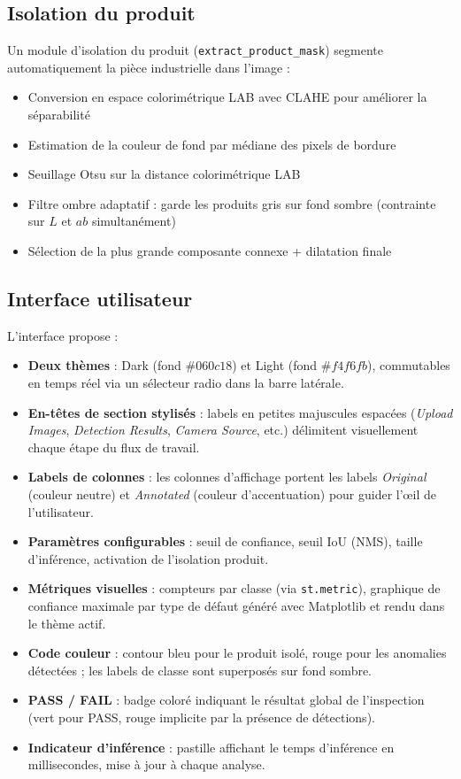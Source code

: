 \documentclass[12pt, a4paper]{report}
\begin{document}
\subsection{Isolation du produit}

Un module d'isolation du produit (\texttt{extract\_product\_mask}) segmente automatiquement la pièce industrielle dans l'image :
\begin{itemize}
  \item Conversion en espace colorimétrique LAB avec CLAHE pour améliorer la séparabilité
  \item Estimation de la couleur de fond par médiane des pixels de bordure
  \item Seuillage Otsu sur la distance colorimétrique LAB
  \item Filtre ombre adaptatif : garde les produits gris sur fond sombre (contrainte sur $L$ et $ab$ simultanément)
  \item Sélection de la plus grande composante connexe + dilatation finale
\end{itemize}

\subsection{Interface utilisateur}

L'interface propose :
\begin{itemize}
  \item \textbf{Deux thèmes} : Dark (fond $\#060c18$) et Light (fond $\#f4f6fb$), commutables en temps réel via un sélecteur radio dans la barre latérale.
  \item \textbf{En-têtes de section stylisés} : labels en petites majuscules espacées (\textit{Upload Images}, \textit{Detection Results}, \textit{Camera Source}, etc.) délimitent visuellement chaque étape du flux de travail.
  \item \textbf{Labels de colonnes} : les colonnes d'affichage portent les labels \textit{Original} (couleur neutre) et \textit{Annotated} (couleur d'accentuation) pour guider l'œil de l'utilisateur.
  \item \textbf{Paramètres configurables} : seuil de confiance, seuil IoU (NMS), taille d'inférence, activation de l'isolation produit.
  \item \textbf{Métriques visuelles} : compteurs par classe (via \texttt{st.metric}), graphique de confiance maximale par type de défaut généré avec Matplotlib et rendu dans le thème actif.
  \item \textbf{Code couleur} : contour bleu pour le produit isolé, rouge pour les anomalies détectées ; les labels de classe sont superposés sur fond sombre.
  \item \textbf{PASS / FAIL} : badge coloré indiquant le résultat global de l'inspection (vert pour PASS, rouge implicite par la présence de détections).
  \item \textbf{Indicateur d'inférence} : pastille affichant le temps d'inférence en millisecondes, mise à jour à chaque analyse.
\end{itemize}
\end{document}
